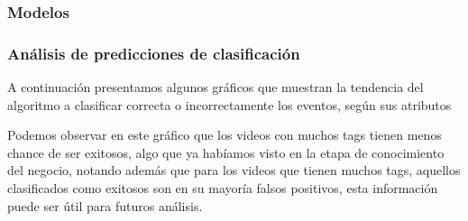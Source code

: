     \subsubsection{Modelos}

        \def\RUN{1}
        \def\title{Resultados de la corrida 1 del arbol de decisión J48}
        \def\algorithm{weka}
        \def\numberOfRules{17}
        \def\hasRules{1}
        
        \newpage

        \def\RUN{2}
        \def\title{Resultados de la corrida 2 del arbol de decisión J48}
        \def\algorithm{weka}
        \def\numberOfRules{20}
        \def\hasRules{1}
        
        \newpage

        \def\RUN{1}
        \def\title{Resultados de la corrida de Perceptron}
        \def\algorithm{perceptron}
        \def\numberOfRules{20}
        \def\hasRules{0}
        

    \subsubsection{Análisis de predicciones de clasificación}

        A continuación presentamos algunos gráficos que muestran la tendencia
        del algoritmo a clasificar correcta o incorrectamente los eventos, según
        sus atributos

        \begin{figure}[ht]
        \end{figure}
        \FloatBarrier

        Podemos observar en este gráfico que los videos con muchos tags tienen
        menos chance de ser exitosos, algo que ya habíamos visto en la etapa de
        conocimiento del negocio, notando además que para los videos que tienen
        muchos tags, aquellos clasificados como exitosos son en su mayoría
        falsos positivos, esta información puede ser útil para futuros análisis.

